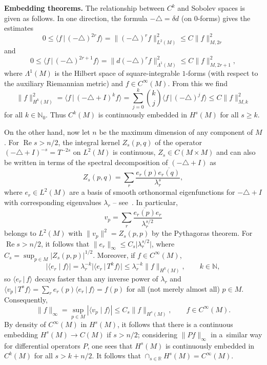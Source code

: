 \documentclass[pdftex]{sigma}
\numberwithin{equation}{section}
\newcommand{\RR}{{\mathbb R}}
\newcommand{\NN}{{\mathbb N}}
\renewcommand{\Re}{\operatorname{Re}}
\newcommand{\ip}[2]{{\big\langle #1 \, \big|\, #2\big\rangle}}
\begin{document}
 {\bf Embedding theorems.}
 The relationship between $C^k$ and Sobolev spaces is given as follows. In one direction, the formula $-\triangle=\delta d$ (on $0$-forms) gives the estimates
 \begin{equation*}
 	0\le \ip{f}{(-\triangle)^{2r}f} = \| (-\triangle)^r f\|^2_{L^2(M)}\le C\|f\|_{M,2r}^2
 \end{equation*}
 and
 \begin{equation*}
 	0\le \ip{f}{(-\triangle)^{2r+1}f} = \| d(-\triangle)^r f\|^2_{\Lambda^1(M)}\le C\|f\|_{M,2r+1}^2 ,
 \end{equation*}
 where $\Lambda^1(M)$ is the Hilbert space of square-integrable $1$-forms (with respect to the auxiliary Riemannian metric) and $f\in C^\infty(M)$.
 From this we find
 \begin{equation*}
 	\|f\|_{H^k(M)}^2 = \ip{f}{(-\triangle+I)^k f} = \sum_{j=0}^k \binom{k}{j} \ip{f}{(-\triangle)^{j}f} \le C \|f\|_{M,k}^2
 \end{equation*}
 for all $k\in \NN_0$. Thus $C^k(M)$ is continuously embedded in $H^s(M)$ for all $s\ge k$.

 On the other hand, now let $n$ be the maximum dimension of any component of $M$.
 For $\Re s>n/2$, the integral kernel $Z_s(p,q)$ of the operator $(-\triangle+I)^{-s}=T^{-2s}$ on $L^2(M)$ is continuous, $Z_s\in C(M\times M)$ and can also be written
 in terms of the spectral decomposition of
 $(-\triangle+I)$ as
 \begin{equation*}
 	Z_s(p,q) = \sum_{r} \frac{e_r(p)\overline{e_r(q)}}{\lambda_r^{s}},
 \end{equation*}
 where $e_r\in L^2(M)$ are a basis of smooth orthonormal eigenfunctions for $-\triangle+I$ with corresponding eigenvalues $\lambda_r$ -- see~\cite{Seeley:1967}. In particular,
 \begin{equation*}
 	v_p = \sum_{r} \frac{\overline{e_r(p)}e_r}{\lambda_r^{s/2}}
 \end{equation*}
 belongs to $L^2(M)$ with $\|v_p\|^2 = Z_s(p,p)$ by the Pythagoras theorem.
 For $\Re s>n/2$, it follows that $\|e_r\|_\infty \le C_s\big|\lambda_r^{s/2}\big|$, where $C_s=\sup_{p\in M}|Z_s(p,p)|^{1/2}$. Moreover, if $f\in C^\infty(M)$,
 \begin{equation*}
 	|\langle e_r \mid f \rangle|=\lambda_r^{-k}\big|\ip{e_r}{T^k f}\big|\le \lambda^{-k}_r\|f\|_{H^k(M)},\qquad k\in\NN,
 \end{equation*}
 so $\ip{e_r}{f}$ decays faster than any inverse power of $\lambda_r$ and
 $\ip{v_p}{T^s f} = \sum_r e_r(p)\ip{e_r}{f}= f(p)$ for all (not merely almost all) $p\in M$. Consequently,
 \begin{equation*}
 	\|f\|_\infty =\sup_{p\in M} |\langle v_p \mid f \rangle|\le C_s \|f\|_{H^s(M)}, \qquad f\in C^\infty(M).
 \end{equation*}
 By density of $C^\infty(M)$ in $H^s(M)$, it follows
 that there is a continuous embedding $H^s(M)\to C(M)$ if $s>n/2$; considering $\|Pf\|_\infty$ in a~similar way for differential operators $P$, one sees that $H^s(M)$ is continuously embedded in $C^k(M)$ for all $s>k+n/2$. It follows that $\cap_{s\in\RR} H^s(M)=C^\infty(M)$.
\end{document}
